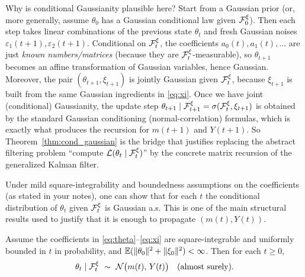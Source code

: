 Why is conditional Gaussianity plausible here?
Start from a Gaussian prior (or, more generally, assume \(\theta_0\) has a Gaussian conditional law given \(\mathcal{F}_0^\xi\)).
Then each step takes linear combinations of the previous state \(\theta_t\) and fresh Gaussian noises
\(\varepsilon_1(t+1),\varepsilon_2(t+1)\).
Conditional on \(\mathcal{F}_t^\xi\), the coefficients \(a_0(t),a_1(t),\dots\) are just \emph{known numbers/matrices}
(because they are \(\mathcal{F}_t^\xi\)-measurable), so \(\theta_{t+1}\) becomes an affine transformation of Gaussian variables,
hence Gaussian.
Moreover, the pair \((\theta_{t+1},\xi_{t+1})\) is jointly Gaussian given \(\mathcal{F}_t^\xi\), because \(\xi_{t+1}\) is built from
the same Gaussian ingredients in \eqref{eq:xi}.
Once we have joint (conditional) Gaussianity, the update step
\(\theta_{t+1}\mid \mathcal{F}_{t+1}^\xi=\sigma(\mathcal{F}_t^\xi,\xi_{t+1})\)
is obtained by the standard Gaussian conditioning (normal-correlation) formulas,
which is exactly what produces the recursion for \(m(t+1)\) and \(Y(t+1)\).
So Theorem~\ref{thm:cond_gaussian} is the bridge that justifies replacing the abstract filtering problem
``compute \(\mathcal{L}(\theta_t\mid \mathcal{F}_t^\xi)\)'' by the concrete matrix recursion of the generalized Kalman filter.


Under mild square-integrability and boundedness assumptions on the coefficients (as stated in your notes),
one can show that for each \(t\) the conditional distribution of \(\theta_t\) given \(\mathcal{F}_t^\xi\) is Gaussian a.s.
This is one of the main structural results used to justify that it is enough to propagate \((m(t),Y(t))\).

\begin{theorem}
\label{thm:cond_gaussian}
Assume the coefficients in \eqref{eq:theta}--\eqref{eq:xi} are square-integrable and uniformly bounded in \(t\) in probability,
and \(\mathbb{E}(\|\theta_0\|^2+\|\xi_0\|^2)<\infty\).
Then for each \(t\ge 0\),
\[
\theta_t\mid \F_t^\xi \ \sim\ \mathcal{N}\bigl(m(t),\,Y(t)\bigr)
\quad\text{(almost surely)}.
\]
\end{theorem}

